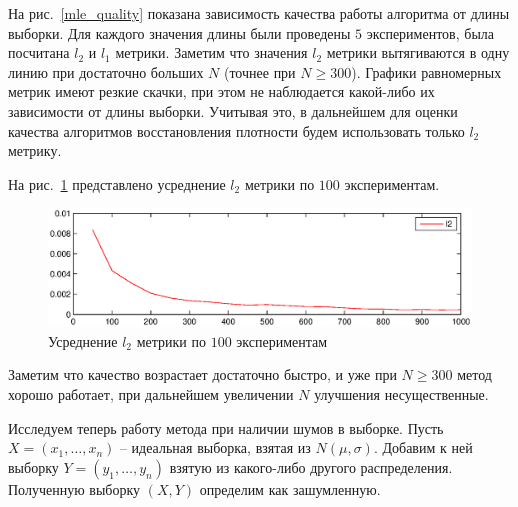 \documentclass[10pt, a4paper]{article}
\begin{document}
\nopagebreak[4]
На рис.~\ref{mle_quality} показана зависимость качества работы алгоритма от длины выборки.
Для каждого значения длины были проведены $5$ экспериментов, была посчитана $l_2$ и $l_1$
метрики. Заметим что значения $l_2$ метрики вытягиваются в одну линию при достаточно больших $N$
(точнее при $N\ge300$).
Графики равномерных метрик имеют резкие скачки, при этом не наблюдается какой-либо их зависимости от длины выборки.
Учитывая это, в дальнейшем для оценки качества алгоритмов восстановления плотности будем использовать только $l_2$ 
метрику.

На рис.~\ref{mle_quality_avg} представлено усреднение $l_2$ метрики по $100$ экспериментам.
\begin{figure}[h]
    \includegraphics[width=\textwidth]{mle_quality_avg.eps}
    \caption{Усреднение $l_2$ метрики по $100$ экспериментам}
    \label{mle_quality_avg}
\end{figure}
Заметим что качество возрастает достаточно быстро, и уже при $N\ge300$ метод хорошо работает,
при дальнейшем увеличении $N$ улучшения несущественные.

Исследуем теперь работу метода при наличии шумов в выборке.
Пусть $X=(x_1, \hdots, x_n)$ -- идеальная выборка, взятая из $N(\mu,\sigma)$.
Добавим к ней выборку $Y=(y_1,\hdots,y_n)$ взятую из какого-либо другого распределения.
Полученную выборку $(X, Y)$ определим как зашумленную.
\end{document}

